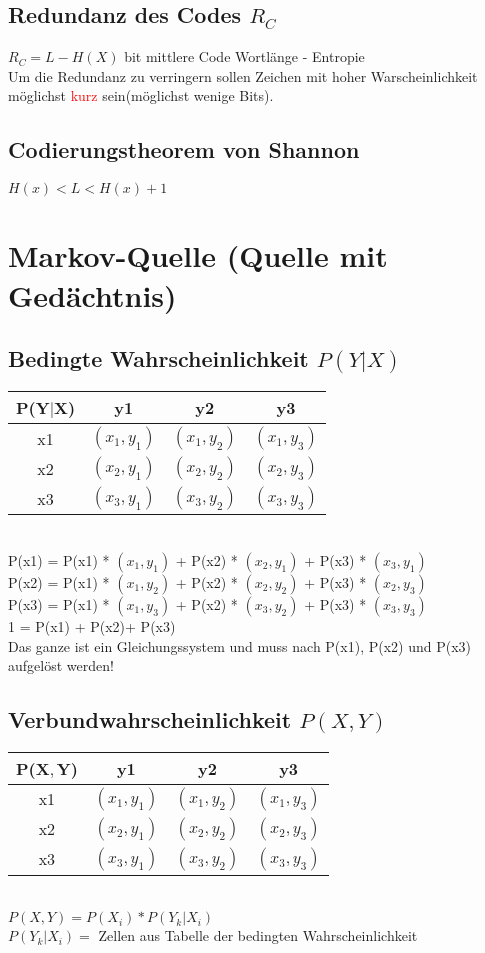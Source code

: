 \subsection{Redundanz des Codes $R_C$}
\colorbox{lightlightgrey}{$R_C = L - H(X)$ bit} mittlere Code Wortlänge - Entropie\\
Um die Redundanz zu verringern sollen Zeichen mit hoher Warscheinlichkeit möglichst \textcolor{red}{kurz} sein(möglichst wenige Bits).
\subsection{Codierungstheorem von Shannon}
\colorbox{lightlightgrey}{$H(x)<L<H(x) + 1$}




\section{Markov-Quelle (Quelle mit Gedächtnis)}
\subsection{Bedingte Wahrscheinlichkeit $P(Y|X)$}
\begin{tabular}{ |c|c|c|c| }
    \hline
    P(Y$|$X) & y1 & y2 & y3\\
    \hline
    x1 & $(x_1,y_1)$ & $(x_1,y_2)$ & $(x_1,y_3)$\\
    \hline
    x2 & $(x_2,y_1)$ & $(x_2,y_2)$ & $(x_2,y_3)$\\
    \hline
    x3 & $(x_3,y_1)$ & $(x_3,y_2)$ & $(x_3,y_3)$ \\
    \hline
\end{tabular}
\\
\colorbox{lightlightgrey}{P(x1) = P(x1) * $(x_1,y_1)$ + P(x2) * $(x_2,y_1)$ + P(x3) * $(x_3,y_1)$}\\
\colorbox{lightlightgrey}{P(x2) = P(x1) * $(x_1,y_2)$ + P(x2) * $(x_2,y_2)$ + P(x3) * $(x_2,y_3)$}\\
\colorbox{lightlightgrey}{P(x3) = P(x1) * $(x_1,y_3)$ + P(x2) * $(x_3,y_2)$ + P(x3) * $(x_3,y_3)$}\\
\colorbox{lightlightgrey}{1 = P(x1) + P(x2)+ P(x3)}\\
Das ganze ist ein Gleichungssystem und muss nach P(x1), P(x2) und P(x3) aufgelöst werden!
\subsection{Verbundwahrscheinlichkeit $P(X,Y)$}
\begin{tabular}{ |c|c|c|c| }
    \hline
    P(X$,$Y) & y1 & y2 & y3\\
    \hline
    x1 & $(x_1,y_1)$ & $(x_1,y_2)$ & $(x_1,y_3)$\\
    \hline
    x2 & $(x_2,y_1)$ & $(x_2,y_2)$ & $(x_2,y_3)$\\
    \hline
    x3 & $(x_3,y_1)$ & $(x_3,y_2)$ & $(x_3,y_3)$ \\
    \hline
\end{tabular}\\
\colorbox{lightlightgrey}{$P(X,Y) = P(X_i) * P(Y_k | X_i)$}\\
$P(Y_k | X_i) = $ Zellen aus Tabelle der bedingten Wahrscheinlichkeit
